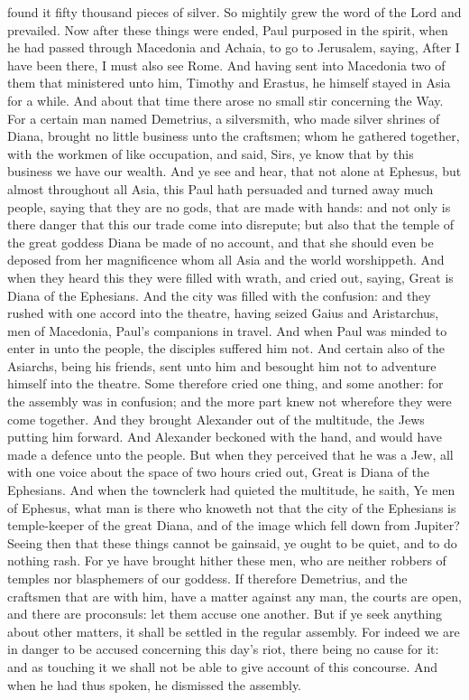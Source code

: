 found it fifty thousand pieces of silver. So mightily grew the word of the Lord and prevailed.  Now after these things were ended, Paul purposed in the spirit, when he had passed through Macedonia and Achaia, to go to Jerusalem, saying, After I have been there, I must also see Rome. And having sent into Macedonia two of them that ministered unto him, Timothy and Erastus, he himself stayed in Asia for a while.  And about that time there arose no small stir concerning the Way. For a certain man named Demetrius, a silversmith, who made silver shrines of Diana, brought no little business unto the craftsmen; whom he gathered together, with the workmen of like occupation, and said, Sirs, ye know that by this business we have our wealth. And ye see and hear, that not alone at Ephesus, but almost throughout all Asia, this Paul hath persuaded and turned away much people, saying that they are no gods, that are made with hands: and not only is there danger that this our trade come into disrepute; but also that the temple of the great goddess Diana be made of no account, and that she should even be deposed from her magnificence whom all Asia and the world worshippeth. And when they heard this they were filled with wrath, and cried out, saying, Great is Diana of the Ephesians. And the city was filled with the confusion: and they rushed with one accord into the theatre, having seized Gaius and Aristarchus, men of Macedonia, Paul’s companions in travel. And when Paul was minded to enter in unto the people, the disciples suffered him not. And certain also of the Asiarchs, being his friends, sent unto him and besought him not to adventure himself into the theatre. Some therefore cried one thing, and some another: for the assembly was in confusion; and the more part knew not wherefore they were come together. And they brought Alexander out of the multitude, the Jews putting him forward. And Alexander beckoned with the hand, and would have made a defence unto the people. But when they perceived that he was a Jew, all with one voice about the space of two hours cried out, Great is Diana of the Ephesians. And when the townclerk had quieted the multitude, he saith, Ye men of Ephesus, what man is there who knoweth not that the city of the Ephesians is temple-keeper of the great Diana, and of the image which fell down from Jupiter? Seeing then that these things cannot be gainsaid, ye ought to be quiet, and to do nothing rash. For ye have brought hither these men, who are neither robbers of temples nor blasphemers of our goddess. If therefore Demetrius, and the craftsmen that are with him, have a matter against any man, the courts are open, and there are proconsuls: let them accuse one another. But if ye seek anything about other matters, it shall be settled in the regular assembly. For indeed we are in danger to be accused concerning this day’s riot, there being no cause for it: and as touching it we shall not be able to give account of this concourse. And when he had thus spoken, he dismissed the assembly. 

